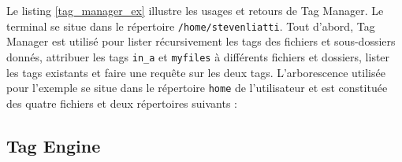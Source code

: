 Le listing \ref{tag_manager_ex} illustre les usages et retours de Tag Manager. Le terminal se situe 
dans le répertoire \texttt{/home/stevenliatti}. Tout d'abord, Tag Manager est utilisé pour 
lister récursivement les tags des fichiers et sous-dossiers donnés, attribuer les tags \texttt{in_a} 
et \texttt{myfiles} à différents fichiers et dossiers, lister les tags existants et faire 
une requête sur les deux tags. L'arborescence utilisée pour l'exemple se situe dans le répertoire 
\texttt{home} de l'utilisateur et est constituée des quatre fichiers et deux répertoires suivants :
\bigbreak
{}
\bigbreak


\subsection{Tag Engine}\label{tag_engine_realisation}
